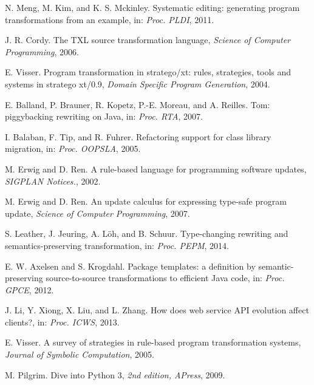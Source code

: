 \documentclass{sigplanconf}
\begin{document}
\begin{thebibliography}{}
    N. Meng, M. Kim, and K. S. Mckinley. Systematic editing: generating program transformations
    from an example, in: \emph{Proc. PLDI}, 2011.
    
    J. R. Cordy. The TXL source transformation language, \emph{Science of Computer Programming},
    2006.

    E. Visser. Program transformation in stratego/xt: rules, strategies, tools
    and systems in stratego xt/0.9, \emph{Domain Specific Program Generation}, 2004.

    E. Balland, P. Brauner, R. Kopetz, P.-E. Moreau, and A. Reilles. Tom: piggybacking
    rewriting on Java, in: \emph{Proc. RTA}, 2007.

    I. Balaban, F. Tip, and R. Fuhrer. Refactoring support for class library
    migration, in: \emph{Proc. OOPSLA}, 2005.

    M. Erwig and D. Ren. A rule-based language for programming software updates,
    \emph{SIGPLAN Notices.}, 2002.

    M. Erwig and D. Ren. An update calculus for expressing type-safe program
    update, \emph{Science of Computer Programming}, 2007.

    S. Leather, J. Jeuring, A. L\"oh, and B. Schuur. Type-changing rewriting and
    semantics-preserving transformation, in: \emph{Proc. PEPM}, 2014.

    E. W. Axelsen and S. Krogdahl. Package templates: a definition by semantic-preserving
    source-to-source transformations to efficient Java code, in: \emph{Proc. GPCE}, 2012.

    J. Li, Y. Xiong, X. Liu, and L. Zhang. How does web service API evolution affect clients?,
    in: \emph{Proc. ICWS}, 2013.

    E. Visser. A survey of strategies in rule-based program transformation systems,
    \emph{Journal of Symbolic Computation}, 2005.

    M. Pilgrim. Dive into Python 3, \emph{2nd edition, APress}, 2009.


\end{thebibliography}
\end{document}
